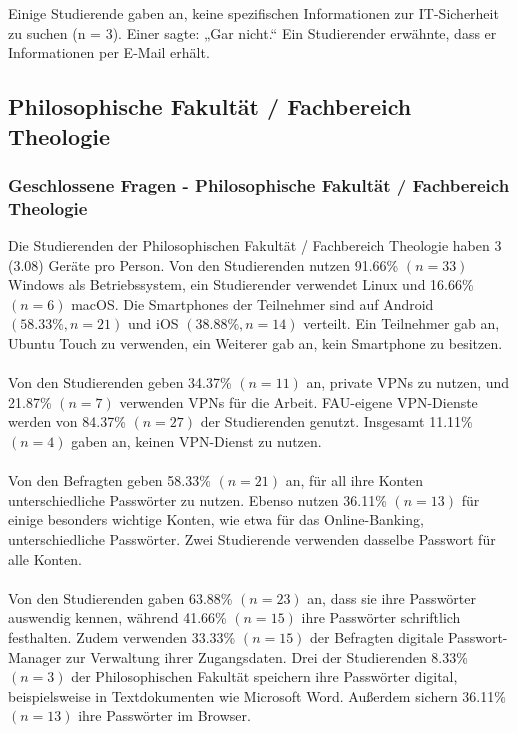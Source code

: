 \documentclass[german,report]{i1thesis}
\begin{document}
Einige Studierende gaben an, keine spezifischen Informationen zur IT-Sicherheit zu suchen (n = 3). Einer sagte: „Gar nicht.“ Ein Studierender erwähnte, dass er Informationen per E-Mail erhält.

\subsection{Philosophische Fakultät / Fachbereich Theologie}

\subsubsection{Geschlossene Fragen - Philosophische Fakultät / Fachbereich Theologie}

Die Studierenden der Philosophischen Fakultät / Fachbereich Theologie haben 3 (3.08) Geräte pro Person. Von den Studierenden nutzen 91.66\% \((n = 33)\) Windows als Betriebssystem, ein Studierender verwendet Linux und 16.66\% \((n = 6)\) macOS. Die Smartphones der Teilnehmer sind auf Android \((58.33\%, n = 21)\) und iOS \((38.88\%, n = 14)\) verteilt. Ein Teilnehmer gab an, Ubuntu Touch zu verwenden, ein Weiterer gab an, kein Smartphone zu besitzen.\\
\\
Von den Studierenden geben 34.37\% \((n = 11)\) an, private VPNs zu nutzen, und 21.87\% \((n = 7)\) verwenden VPNs für die Arbeit. FAU-eigene VPN-Dienste werden von 84.37\% \((n = 27)\) der Studierenden genutzt. Insgesamt 11.11\% \((n = 4)\) gaben an, keinen VPN-Dienst zu nutzen.\\
\\
Von den Befragten geben 58.33\% \((n=21)\) an, für all ihre Konten unterschiedliche Passwörter zu nutzen. Ebenso nutzen 36.11\% \((n=13)\) für einige besonders wichtige Konten, wie etwa für das Online-Banking, unterschiedliche Passwörter. Zwei Studierende verwenden dasselbe Passwort für alle Konten.\\
\\
Von den Studierenden gaben 63.88\% \((n=23)\) an, dass sie ihre Passwörter auswendig kennen, während 41.66\% \((n=15)\) ihre Passwörter schriftlich festhalten. Zudem verwenden 33.33\% \((n=15)\) der Befragten digitale Passwort-Manager zur Verwaltung ihrer Zugangsdaten. Drei der Studierenden 8.33\% \((n=3)\) der Philosophischen Fakultät speichern ihre Passwörter digital, beispielsweise in Textdokumenten wie Microsoft Word. Außerdem sichern 36.11\% \((n=13)\) ihre Passwörter im Browser.\\
\end{document}
